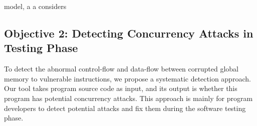 model, 
a 
a 
considers







\vspace{-.15in}\subsection{Objective 2: Detecting Concurrency Attacks in 
Testing Phase}\label{sec:detect}\vspace{-.075in}

To detect the abnormal control-flow and data-flow between corrupted global 
memory to vulnerable instructions, we propose a systematic detection approach. 
Our tool takes program source code as input, and its output is whether this 
program has potential concurrency attacks. This approach is mainly for program 
developers to detect potential attacks and fix them during the software testing 
phase.

